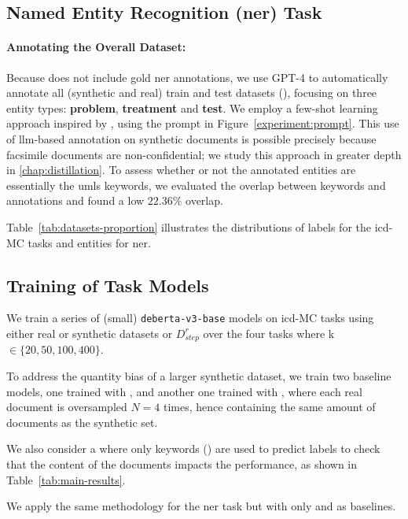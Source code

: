 \subsection{Named Entity Recognition (\gls{ner}) Task}
\paragraph{Annotating the Overall Dataset:}

Because \mimic does not include gold \gls{ner} annotations, we use GPT-4 to automatically annotate all (synthetic and real) train and test datasets (\citet{noauthor_gpt-4_nodate}), focusing on three entity types: \textbf{problem}, \textbf{treatment} and \textbf{test}. We employ a few-shot learning approach inspired by \citet{hu2024improving}, using the prompt in Figure~\ref{experiment:prompt}. This use of \gls{llm}-based annotation on synthetic documents is possible precisely because facsimile documents are non-confidential; we study this approach in greater depth in \autoref{chap:distillation}. To assess whether or not the annotated entities are essentially the \gls{umls} keywords, we evaluated the overlap between keywords and annotations and found a low $22.36\%$ overlap.

Table~\ref{tab:datasets-proportion} illustrates the distributions of labels for the \gls{icd}-MC tasks and entities for \gls{ner}.

\subsection{Training of Task Models}
We train a series of (small) \verb|deberta-v3-base| \cite{heDeBERTaDecodingenhancedBERT2021} models on \gls{icd}-MC tasks using either real or synthetic datasets  \dgold or $D_{step}^{r}$ over the four tasks  where k $\in \{20,50,100,400\}$.

To address the quantity bias of a larger synthetic dataset, we train two baseline models, one trained with \dgold, and another one trained with \dgover, where each real document is oversampled $N=4$ times, hence containing the same amount of documents as the synthetic set.

We also consider a \baseline where only keywords (\ktr) are used to predict labels to check that the content of the documents impacts the performance, as shown in Table~\ref{tab:main-results}.

We apply the same methodology for the \gls{ner} task but with only \dgold and \dgover as baselines.

